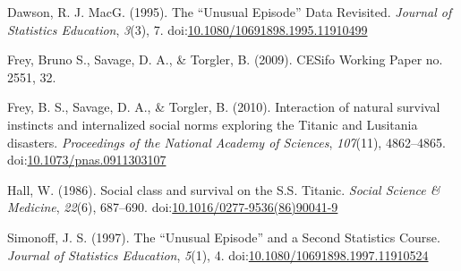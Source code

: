 \documentclass[]{article}
\begin{document}
\hypertarget{refs}{}
\begin{CSLReferences}{1}{0}
\leavevmode\hypertarget{ref-dawson_unusual_1995}{}%
Dawson, R. J. MacG. (1995). The {``{Unusual} {Episode}''} {Data}
{Revisited}. \emph{Journal of Statistics Education}, \emph{3}(3), 7.
doi:\href{https://doi.org/10.1080/10691898.1995.11910499}{10.1080/10691898.1995.11910499}

\leavevmode\hypertarget{ref-frey_cesifo_2009}{}%
Frey, Bruno S., Savage, D. A., \& Torgler, B. (2009). {CESifo} {Working}
{Paper} no. 2551, 32.

\leavevmode\hypertarget{ref-frey_interaction_2010}{}%
Frey, B. S., Savage, D. A., \& Torgler, B. (2010). Interaction of
natural survival instincts and internalized social norms exploring the
{Titanic} and {Lusitania} disasters. \emph{Proceedings of the National
Academy of Sciences}, \emph{107}(11), 4862--4865.
doi:\href{https://doi.org/10.1073/pnas.0911303107}{10.1073/pnas.0911303107}

\leavevmode\hypertarget{ref-hall_social_1986}{}%
Hall, W. (1986). Social class and survival on the {S}.{S}. {Titanic}.
\emph{Social Science \& Medicine}, \emph{22}(6), 687--690.
doi:\href{https://doi.org/10.1016/0277-9536(86)90041-9}{10.1016/0277-9536(86)90041-9}

\leavevmode\hypertarget{ref-simonoff_unusual_1997}{}%
Simonoff, J. S. (1997). The {``{Unusual} {Episode}''} and a {Second}
{Statistics} {Course}. \emph{Journal of Statistics Education},
\emph{5}(1), 4.
doi:\href{https://doi.org/10.1080/10691898.1997.11910524}{10.1080/10691898.1997.11910524}

\end{CSLReferences}
\end{document}

